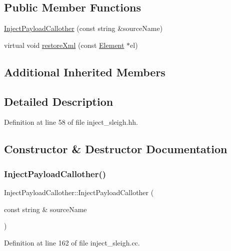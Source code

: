 \subsection*{Public Member Functions}
\begin{DoxyCompactItemize}
\item 
\mbox{\hyperlink{class_inject_payload_callother_a4637515559f9eff71387248534b7c924}{Inject\+Payload\+Callother}} (const string \&source\+Name)
\item 
virtual void \mbox{\hyperlink{class_inject_payload_callother_a1d09a05eebbf6db00fd72650b45b9b85}{restore\+Xml}} (const \mbox{\hyperlink{class_element}{Element}} $\ast$el)
\end{DoxyCompactItemize}
\subsection*{Additional Inherited Members}


\subsection{Detailed Description}


Definition at line 58 of file inject\+\_\+sleigh.\+hh.



\subsection{Constructor \& Destructor Documentation}
\mbox{\label{class_inject_payload_callother_a4637515559f9eff71387248534b7c924}} 
\subsubsection{\texorpdfstring{InjectPayloadCallother()}{InjectPayloadCallother()}}
{\footnotesize\ttfamily Inject\+Payload\+Callother\+::\+Inject\+Payload\+Callother (\begin{DoxyParamCaption}\item[{const string \&}]{source\+Name }\end{DoxyParamCaption})}



Definition at line 162 of file inject\+\_\+sleigh.\+cc.



